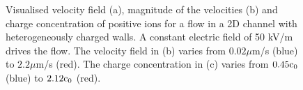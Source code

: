 \begin{figure}
  \centering
  \hspace{5pt}   
\hspace{5pt} 
  \caption[Velocity field for flow in channel with heterogeneously
    charged walls.]{Visualised velocity field (a), magnitude of the
    velocities (b) and charge concentration of positive ions for a
    flow in a 2D channel with heterogeneously charged walls. A
    constant electric field of 50 kV/m drives the flow. The velocity
    field in (b) varies from $0.02 \mu$m/s (blue) to $2.2 \mu$m/s
    (red). The charge concentration in (c) varies from $0.45\mathrm{c}_0 $
    (blue) to $2.12\mathrm{c}_0$ (red).}
  \label{fig:res:hetro}
\end{figure}

